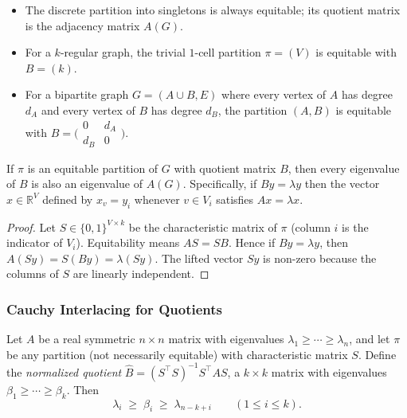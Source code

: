 \begin{example}
\mbox{}
\begin{itemize}
  \item The discrete partition into singletons is always equitable;
        its quotient matrix is the adjacency matrix $A(G)$.
  \item For a $k$-regular graph, the trivial $1$-cell partition
        $\pi = (V)$ is equitable with $B = (k)$.
  \item For a bipartite graph $G = (A \cup B, E)$ where every vertex
        of $A$ has degree $d_A$ and every vertex of $B$ has degree
        $d_B$, the partition $(A, B)$ is equitable with
        $B = \big(\begin{smallmatrix} 0 & d_A \\ d_B & 0 \end{smallmatrix}\big)$.
\end{itemize}
\end{example}

\begin{theorem}\label{thm:quotientspec}
If $\pi$ is an equitable partition of $G$ with quotient matrix $B$,
then every eigenvalue of $B$ is also an eigenvalue of $A(G)$.
Specifically, if $By = \lambda y$ then the vector $x \in \mathbb R^V$
defined by $x_v = y_i$ whenever $v \in V_i$ satisfies $A x = \lambda x$.
\end{theorem}

\begin{proof}
Let $S \in \{0, 1\}^{V \times k}$ be the characteristic matrix of
$\pi$ (column $i$ is the indicator of $V_i$). Equitability means
$AS = SB$. Hence if $By = \lambda y$, then
$A(Sy) = S(By) = \lambda(Sy)$. The lifted vector $Sy$ is non-zero
because the columns of $S$ are linearly independent.
\end{proof}

\subsubsection{Cauchy Interlacing for Quotients}

\begin{theorem}\label{thm:quotinter}
Let $A$ be a real symmetric $n \times n$ matrix with eigenvalues
$\lambda_1 \ge \cdots \ge \lambda_n$, and let $\pi$ be any partition
(not necessarily equitable) with characteristic matrix $S$. Define the
\emph{normalized quotient}
$\hat B = (S^\top S)^{-1} S^\top A S$, a $k \times k$ matrix with
eigenvalues $\beta_1 \ge \cdots \ge \beta_k$. Then
\[
  \lambda_i \;\ge\; \beta_i \;\ge\; \lambda_{n - k + i}
  \qquad (1 \le i \le k).
\]
\end{theorem}

